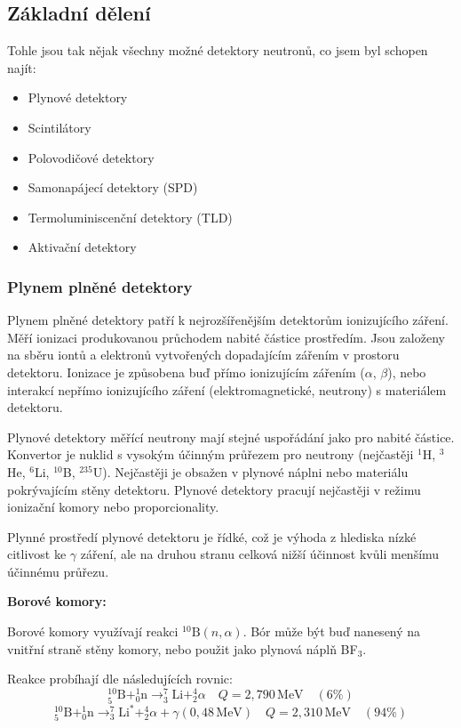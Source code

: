 \subsection{Základní dělení}
Tohle jsou tak nějak všechny možné detektory neutronů, co jsem byl schopen najít:
\begin{itemize}
    \item Plynové detektory
    \item Scintilátory
    \item Polovodičové detektory
    \item Samonapájecí detektory (SPD)
    \item Termoluminiscenční detektory (TLD)
    \item Aktivační detektory
\end{itemize}

\subsubsection{Plynem plněné detektory}

Plynem plněné detektory patří k nejrozšířenějším detektorům ionizujícího záření. Měří ionizaci produkovanou průchodem nabité částice prostředím. Jsou založeny na sběru iontů a elektronů vytvořených dopadajícím zářením v prostoru detektoru. Ionizace je způsobena buď přímo ionizujícím zářením ($\alpha$, $\beta$), nebo interakcí nepřímo ionizujícího záření (elektromagnetické, neutrony) s materiálem detektoru.

Plynové detektory měřící neutrony mají stejné uspořádání jako pro nabité částice. 
Konvertor je nuklid s vysokým účinným průřezem pro neutrony (nejčastěji $^1$H, $^3$He, $^6$Li, $^{10}$B, $^{235}$U). Nejčastěji je obsažen v plynové náplni nebo materiálu pokrývajícím stěny detektoru. Plynové detektory pracují nejčastěji v režimu ionizační komory nebo proporcionality.

Plynné prostředí plynové detektoru je řídké, což je výhoda z hlediska nízké citlivost ke $\gamma$ záření, ale na druhou stranu celková nižší účinnost kvůli menšímu účinnému průřezu.

\textbf{Borové komory:}

Borové komory využívají reakci $^{10}\text{B}(n, \alpha)$. Bór může být buď nanesený na vnitřní straně stěny komory, nebo použit jako plynová náplň BF$_3$. 

Reakce probíhají dle následujících rovnic:
\[
^{10}_5\text{B} + ^1_0\text{n} \rightarrow ^7_3\text{Li} + ^4_2\alpha \quad Q = 2{,}790\,\text{MeV} \quad (6\%)
\]
\[
^{10}_5\text{B} + ^1_0\text{n} \rightarrow ^7_3\text{Li}^* + ^4_2\alpha + \gamma(0{,}48\,\text{MeV}) \quad Q = 2{,}310\,\text{MeV} \quad (94\%)
\]

